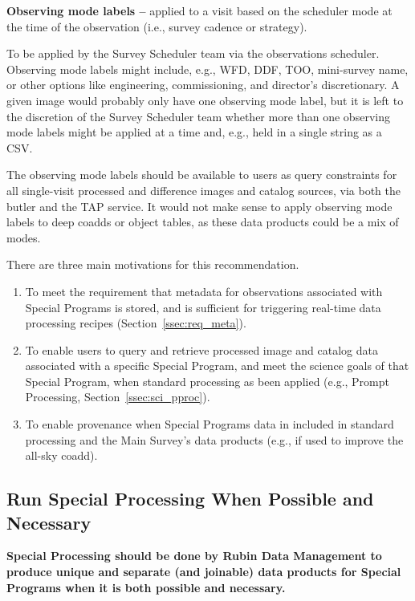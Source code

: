 \textbf{Observing mode labels -- } 
applied to a visit based on the scheduler mode at the time of the observation
(i.e., survey cadence or strategy).

To be applied by the Survey Scheduler team via the observations scheduler.
Observing mode labels might include, e.g., WFD, DDF, TOO, mini-survey name, or other 
options like engineering, commissioning, and director's discretionary.
A given image would probably only have one observing mode label, but
it is left to the discretion of the Survey Scheduler team whether more than one
observing mode labels might be applied at a time and, e.g., held in a single string as a CSV.

The observing mode labels should be available to users as query constraints for
all single-visit processed and difference images and catalog sources,
via both the butler and the TAP service.
It would not make sense to apply observing mode labels to deep coadds or 
object tables, as these data products could be a mix of modes.


There are three main motivations for this recommendation.

\begin{enumerate}

\item To meet the requirement that metadata for observations associated 
with Special Programs is stored, and is sufficient for triggering 
real-time data processing recipes (Section~\ref{ssec:req_meta}).

\item To enable users to query and retrieve processed image and catalog
data associated with a specific Special Program, and meet the science goals
of that Special Program, when standard processing as been applied 
(e.g., Prompt Processing, Section~\ref{ssec:sci_pproc}).

\item To enable provenance when Special Programs data in included in standard
processing and the Main Survey's data products (e.g., if used to improve the
all-sky coadd).

\end{enumerate}

\subsection{Run Special Processing When Possible and Necessary}\label{ssec:sci_sproc}

\textbf{Special Processing should be done by Rubin Data Management to 
produce unique and separate (and joinable) data products
for Special Programs when it is both possible and necessary.}

